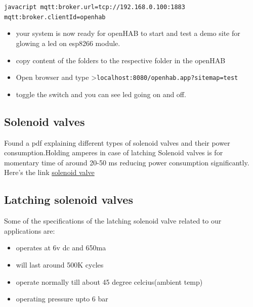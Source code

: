 \documentclass[16pt]{article}
\begin{document}
\texttt{javacript       mqtt:broker.url=tcp://192.168.0.100:1883       mqtt:broker.clientId=openhab}

\begin{itemize}


\item your system is now ready for openHAB to start and test a demo site for
glowing a led on esp8266 module.
\item copy content of the folders to the
respective folder in the openHAB 
\item Open browser and type
\textgreater{}\texttt{localhost:8080/openhab.app?sitemap=test}
\item toggle
the switch and you can see led going on and off.

\end{itemize}

\subsection{Solenoid valves}

\vspace{0.3cm}

  Found a pdf explaining different types of solenoid valves and their
  power consumption.Holding amperes in case of latching Solenoid valves is
  for momentary time of around 20-50 ms reducing power consumption
  significantly. Here's the link {\color{red}\href{http://www.ascovalve.com/common/pdffiles/product/engineeringr5.pdf}{solenoid valve}}

\vspace{0.3cm}

\subsection{Latching solenoid valves}

  Some of the specifications of the latching solenoid valve related to our
  applications are:
  
  \begin{itemize}

  \item
    operates at 6v dc and 650ma
  \item
    will last around 500K cycles
  \item
    operate normally till about 45 degree celcius(ambient temp)
  \item
    operating pressure upto 6 bar
  \end{itemize}
 
\end{document}
